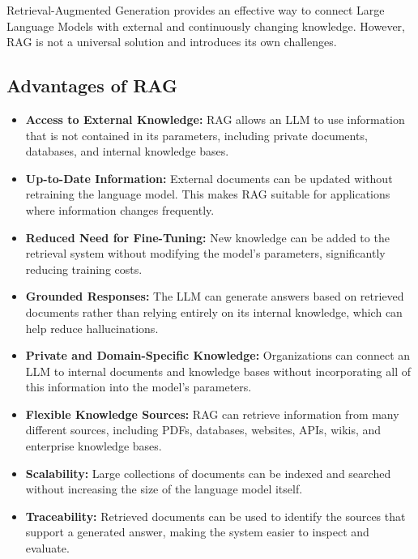 Retrieval-Augmented Generation provides an effective way to connect Large Language Models with external and continuously changing knowledge. However, RAG is not a universal solution and introduces its own challenges.

\subsection*{Advantages of RAG}

\begin{itemize}

    \item \textbf{Access to External Knowledge:}
    RAG allows an LLM to use information that is not contained in its parameters, including private documents, databases, and internal knowledge bases.

    \item \textbf{Up-to-Date Information:}
    External documents can be updated without retraining the language model. This makes RAG suitable for applications where information changes frequently.

    \item \textbf{Reduced Need for Fine-Tuning:}
    New knowledge can be added to the retrieval system without modifying the model's parameters, significantly reducing training costs.

    \item \textbf{Grounded Responses:}
    The LLM can generate answers based on retrieved documents rather than relying entirely on its internal knowledge, which can help reduce hallucinations.

    \item \textbf{Private and Domain-Specific Knowledge:}
    Organizations can connect an LLM to internal documents and knowledge bases without incorporating all of this information into the model's parameters.

    \item \textbf{Flexible Knowledge Sources:}
    RAG can retrieve information from many different sources, including PDFs, databases, websites, APIs, wikis, and enterprise knowledge bases.

    \item \textbf{Scalability:}
    Large collections of documents can be indexed and searched without increasing the size of the language model itself.

    \item \textbf{Traceability:}
    Retrieved documents can be used to identify the sources that support a generated answer, making the system easier to inspect and evaluate.

\end{itemize}

